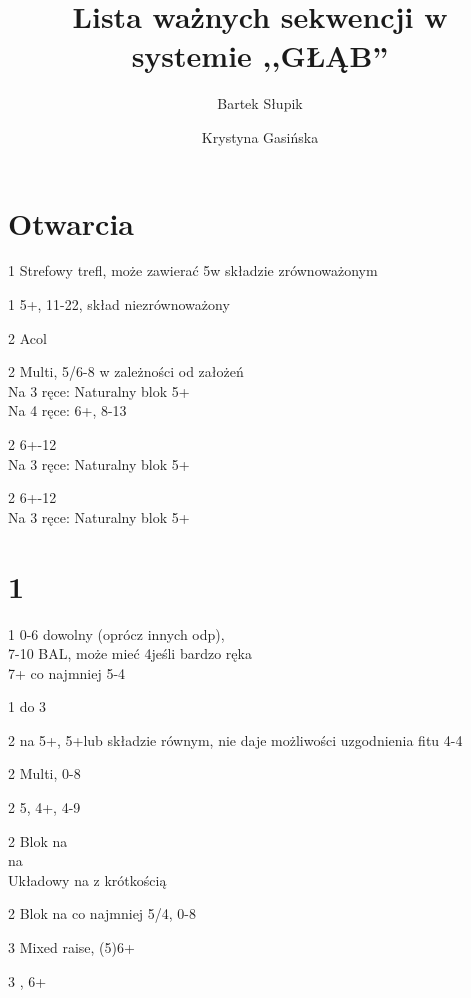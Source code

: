 \documentclass[12pt, a4paper]{article}
\title{\vspace{-2cm}Lista ważnych sekwencji w systemie ,,GŁĄB''}
\date{}
\author{Bartek Słupik \and Krystyna Gasińska}
\begin{document}
\maketitle






\section*{Otwarcia}
\vspace*{0.8cm}
\begin{options}
    \item[1\clubs] Strefowy trefl, może zawierać 5\diams w składzie zrównoważonym
    \item[1\diams] 5+\diams, 11-22, skład niezrównoważony
    \br
    \item[2\clubs] Acol
    \item[2\diams] Multi, 5/6-8 w zależności od założeń \\
                    Na 3 ręce: Naturalny blok 5+\diams \\
                    Na 4 ręce: 6+\diams, 8-13
    \item[2\hearts] 6+-12 \\
                    Na 3 ręce: Naturalny blok 5+\hearts
    \item[2\spades] 6+-12 \\
                    Na 3 ręce: Naturalny blok 5+\spades
\end{options}


\section*{1\clubs}
\sequence{{1\clubs}}
\begin{options}[2]
    \item[1\diams] 0-6 dowolny (oprócz innych odp), \\
    7-10 BAL, może mieć 4\major jeśli bardzo \nt ręka \\
    7+ co najmniej 5-4 \minor
    \item[1\nt] \inv do 3\nt
    \item[2\clubs] \gf na 5+\clubs, 5+\diams lub składzie równym, nie daje możliwości uzgodnienia fitu 4-4\major
    \item[2\diams] Multi, 0-8
    \item[2\hearts] 5\spades, 4+\hearts, 4-9
    \item[2\spades] Blok na \clubs \\
                    \inv na \clubs \\
                    Układowy \gf na \clubs z krótkością   
    \item[2\nt] Blok na \minor co najmniej 5/4, 0-8
    \item[3\clubs] Mixed raise, (5)6+\clubs
    \item[3\diams] \inv, 6+\diams   
\end{options}
\end{document}
